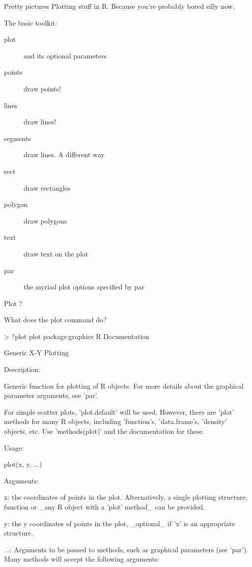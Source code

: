 \documentclass[pdf]{beamer}
\begin{document}
\begin{frame}[fragile]{Pretty pictures}
  Plotting stuff in R. Because you're probably bored silly now.
  
  The basic toolkit:
  \begin{description}
  \item[plot] and its optional parameters
  \item[points] draw points!
  \item[lines] draw lines!
  \item[segments] draw lines. A different way
  \item[rect] draw rectangles
  \item[polygon] draw polygons
  \item[text] draw text on the plot
  \item[par] the myriad plot options specified by par
  \end{description}
\end{frame}

\begin{frame}[fragile]{Plot ?}

  \small What does the plot command do?
  \begin{rcode}
    > ?plot
    plot                 package:graphics                  R Documentation

    Generic X-Y Plotting

    Description:

    Generic function for plotting of R objects.  For more details
    about the graphical parameter arguments, see 'par'.

    For simple scatter plots, 'plot.default' will be used.  However,
    there are 'plot' methods for many R objects, including
    'function's, 'data.frame's, 'density' objects, etc.  Use
    'methods(plot)' and the documentation for these.
    
    Usage:

     plot(x, y, ...)
     
    Arguments:

       x: the coordinates of points in the plot. Alternatively, a
          single plotting structure, function or _any R object with a
          'plot' method_ can be provided.

       y: the y coordinates of points in the plot, _optional_ if 'x' is
          an appropriate structure.

     ...: Arguments to be passed to methods, such as graphical
          parameters (see 'par').  Many methods will accept the
          following arguments:
          
  \end{rcode}
\end{frame}
\end{document}
